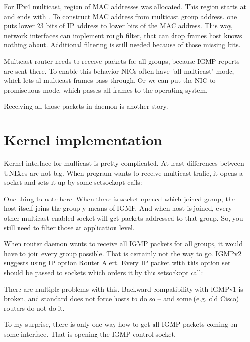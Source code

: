 For IPv4 multicast, region of MAC addresses was allocated. This region starts
at  and ends with . To construct
MAC address from multicast group address, one puts lower 23 bits of IP address
to lower bits of the MAC address. This way, network interfaces can implement
rough filter, that can drop frames host knows nothing about. Additional
filtering is still needed because of those missing bits.

Multicast router needs to receive packets for all groups, because IGMP reports
are sent there. To enable this behavior NICs often have "all multicast" mode,
which lets al multicast frames pass through. Or we can put the NIC to
promiscuous mode, which passes all frames to the operating system.

Receiving all those packets in daemon is another story.

\section{Kernel implementation}

Kernel interface for multicast is pretty complicated. At least differences
between UNIXes are not big. When program wants to receive multicast trafic,
it opens a socket and sets it up by some setsockopt calls:


\noindent One thing to note here. When there is socket opened which joined group, the host
itself joins the group y means of IGMP. And when host is joined, every other
multicast enabled socket will get packets addressed to that group. So, you
still need to filter those at application level.

When router daemon wants to receive all IGMP packets for all groups, it
would have to join every group possible. That is certainly not the way to go.
IGMPv2 suggests using IP option Router Alert. Every IP packet with this option
set should be passed to sockets which orders it by this setsockopt call:


\noindent There are multiple problems with this. Backward compatibility with IGMPv1 is
broken, and standard does not force hosts to do so -- and some (e.g. old Cisco)
routers do not do it.

To my surprise, there is only one way how to get all IGMP packets coming on
some interface. That is opening the IGMP control socket.

